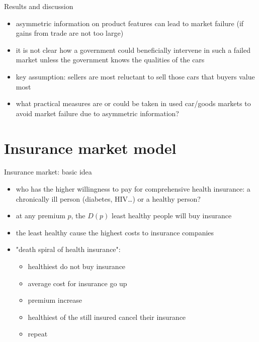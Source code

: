 \documentclass[bigger]{beamer}
\begin{document}
\begin{frame}[label={sec:orgbfa4a49}]{Results and discussion}
\begin{itemize}
\item asymmetric information on product features can lead to market failure (if gains from trade are not too large)
\item it is not clear how a government could beneficially intervene in such a failed market unless the government knows the qualities of the cars
\item key assumption: sellers are most reluctant to sell those cars that buyers value most
\item what practical measures are or could be taken in used car/goods markets to avoid market failure due to asymmetric information?
\end{itemize}
\end{frame}

\section{Insurance market model}
\label{sec:orgdf91013}
\begin{frame}[label={sec:org15011c1}]{Insurance market: basic idea}
\begin{itemize}
\item who has the higher willingness to pay for comprehensive health insurance: a chronically ill person (diabetes, HIV\dots{}) or a healthy person?
\pause
\item at any premium \(p\), the \(D(p)\) least healthy people will buy insurance
\item the least healthy cause the highest costs to insurance companies
\item "death spiral of health insurance":
\begin{itemize}
\item healthiest do not buy insurance
\item average cost for insurance go up
\item premium increase
\item healthiest of the still insured cancel their insurance
\item repeat
\end{itemize}
\end{itemize}
\end{frame}
\end{document}
